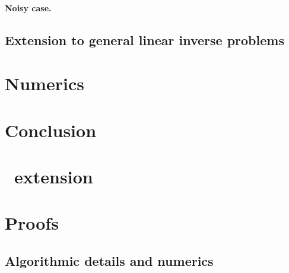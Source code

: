 \documentclass{article}
\begin{document}
\paragraph{Noisy case.}
\label{sec:noisy}

\subsection{Extension to general linear inverse problems}
\label{sec:gen_lin_ip}

\section{Numerics}

\section{Conclusion}





\newpage
\begin{appendix}
  \section{\smcdiff\ extension}
  \label{sec:smc_diff_ext}
  
  \section{Proofs}
  
  \subsection{Algorithmic details and numerics}
  \label{appendix:numerics}
  
\end{appendix}
\end{document}
